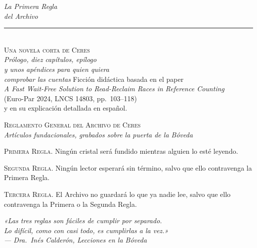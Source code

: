 \thispagestyle{empty}
\vspace*{30mm}
\begin{center}
{\fontsize{24}{28}\selectfont\itshape La Primera Regla\\[1mm] del Archivo}\\[8mm]
{\color{oxido}\rule{18mm}{0.4pt}}\\[8mm]
{\scshape Una novela corta de Ceres}\\[30mm]
{\small\itshape Prólogo, diez capítulos, epílogo\\ y unos apéndices para quien quiera\\ comprobar las cuentas}
\vfill
{\footnotesize\color{gris} Ficción didáctica basada en el paper\\
\emph{A Fast Wait-Free Solution to Read-Reclaim Races in Reference Counting}\\
(Euro-Par 2024, LNCS 14803, pp.~103--118)\\ y en su explicación detallada en español.}
\end{center}
\clearpage

\thispagestyle{empty}
\vspace*{40mm}
\begin{center}
{\scshape\color{oxido} Reglamento General del Archivo de Ceres}\\[2mm]
{\footnotesize\itshape Artículos fundacionales, grabados sobre la puerta de la Bóveda}\\[10mm]
\begin{minipage}{0.8\textwidth}
\setlength{\parskip}{4mm}
\noindent\textsc{Primera Regla.} Ningún cristal será fundido mientras alguien lo esté leyendo.

\noindent\textsc{Segunda Regla.} Ningún lector esperará sin término, salvo que ello contravenga la Primera Regla.

\noindent\textsc{Tercera Regla.} El Archivo no guardará lo que ya nadie lee, salvo que ello contravenga la Primera o la Segunda Regla.
\end{minipage}
\end{center}
\vfill
\begin{flushright}
\footnotesize\itshape «Las tres reglas son fáciles de cumplir por separado.\\ Lo difícil, como con casi todo, es cumplirlas a la vez.»\\[1mm]
\upshape --- Dra.\ Inés Calderón, \emph{Lecciones en la Bóveda}
\end{flushright}
\clearpage

